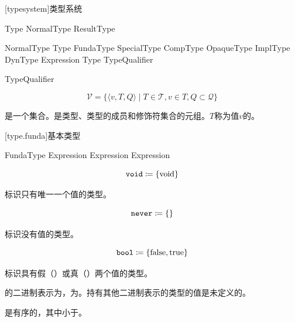 
[typesystem]{类型系统}

\begin{bnf}{Type}
    NormalType \br
    ResultType
\end{bnf}

\begin{bnf}{NormalType}
    \terminal{(} Type \terminal{)} \br
    FundaType \br
    SpecialType \br
    CompType \br
    OpaqueType \br
    ImplType \br
    DynType \br
     \terminal{(} Expression \terminal{)} \br
    Type TypeQualifier
\end{bnf}

\begin{bnf}{TypeQualifier}
     \br
\end{bnf}

$$ \mathcal{V} = \{ \langle v, T, Q \rangle \mid T \in \mathcal{T}, v \in T, Q \subset \mathcal{Q} \} $$

\pnum
{}是一个集合。是类型、类型的成员和修饰符集合的元组。$T$称为值$v$的。

[type.funda]{基本类型}

\begin{bnf}{FundaType}
     \br
     \br
     \br
     \br
     \br
     \terminal{<} Expression \terminal{>} \br
     \terminal{<} Expression \terminal{>} \br
     \br
     \terminal{<} Expression \terminal{>} \br
     \br
     \br
\end{bnf}

$$\texttt{void} \coloneqq \{ \mathrm{void} \}$$

\pnum
{}标识只有唯一一个值的类型。

$$\texttt{never} \coloneqq \{ \}$$

\pnum
{}标识没有值的类型。

$$\texttt{bool} \coloneqq \{ \mathrm{false}, \mathrm{true} \}$$

\pnum
{}标识具有假（）或真（）两个值的类型。

\pnum
{}的二进制表示为，为。持有其他二进制表示的类型的值是未定义的。

\pnum
{}是有序的，其中小于。

